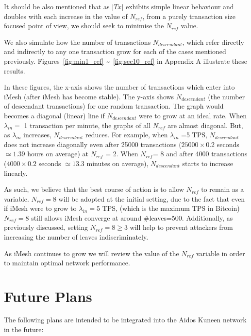 \documentclass[a4paper,10pt,twocolumn]{article}
\begin{document}
	It should be also  mentioned that as \(|Tx|\) exhibits simple linear behaviour and doubles with each increase in the value of \( N_{ref} \), from a purely transaction size focused point of view, we should seek 
	to minimise the \( N_{ref} \) value.
	
	We also simulate how the number of transactions \( N_{descendant} \), which refer directly and indirectly to any one transaction grow 
	 for each of the cases mentioned previously. Figures~\ref{fig:min1_ref} \textasciitilde~\ref{fig:sec10_ref} in Appendix A illustrate these results.
	 
	 In these figures, the x-axis shows the number of transactions which enter into iMesh (after iMesh has become stable). The y-axis shows \( N_{descendant} \) 
	 (the number of descendant transactions) for one random transaction. The graph would becomes a diagonal (linear) line if \( N_{descendant} \) were to grow at an ideal rate.
	 When \( \lambda_{in}=\) 1 transaction per minute, the graphs of all \( N_{ref}\) are almost diagonal.
	 But, as \( \lambda_{in}\) increases,  \( N_{descendant} \) reduces.
	 For example, when \( \lambda_{in}\) =5 TPS, \( N_{descendant} \) 
	 does not increase diagonally even after  25000 transactions (\( 25000 \times 0.2\) seconds \(\simeq 1.39 \) hours on average) at \( N_{ref} \) = 2.
When \( N_{ref}\)= 8 and after 4000 transactions (\( 4000 \times 0.2\) seconds \(\simeq 13.3 \) minutes on average),
 \( N_{descendant}\) starts to increase linearly.

	 As such, we believe that the best course of action is to allow \( N_{ref}\) to remain as a variable. \( N_{ref}=8\) will be adopted at the initial setting, due to the fact that 
	 even if iMesh were to grow to \( \lambda_{in}=5\) TPS, (which is the maximum TPS
	 in Bitcoin) \( N_{ref}=8\) still allows iMesh converge at around \#leaves=500. 
	 Additionally, as previously discussed, setting \( N_{ref}=8 \geq 3\) will
	 help to prevent attackers from increasing the number of leaves indiscriminately.
	
 	 As iMesh continues to grow we will review the value of the \( N_{ref}\) variable in order to maintain optimal network performance.
 	 
\section{Future Plans}
\label{sec:future plans}

	The following plans are intended to be integrated into the Aidos Kuneen network in the future:
	 
\end{document}
